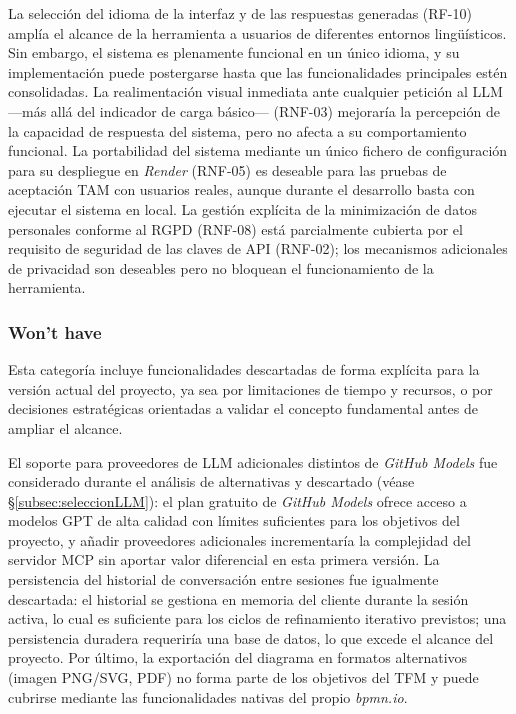 {La selección del idioma de la interfaz y de las respuestas generadas (RF-10) amplía el alcance de la herramienta a usuarios de diferentes entornos lingüísticos. Sin embargo, el sistema es plenamente funcional en un único idioma, y su implementación puede postergarse hasta que las funcionalidades principales estén consolidadas. La realimentación visual inmediata ante cualquier petición al LLM —más allá del indicador de carga básico— (RNF-03) mejoraría la percepción de la capacidad de respuesta del sistema, pero no afecta a su comportamiento funcional. La portabilidad del sistema mediante un único fichero de configuración para su despliegue en \textit{Render} (RNF-05) es deseable para las pruebas de aceptación TAM con usuarios reales, aunque durante el desarrollo basta con ejecutar el sistema en local. La gestión explícita de la minimización de datos personales conforme al RGPD (RNF-08) está parcialmente cubierta por el requisito de seguridad de las claves de API (RNF-02); los mecanismos adicionales de privacidad son deseables pero no bloquean el funcionamiento de la herramienta.

\subsubsection*{Won't have}

Esta categoría incluye funcionalidades descartadas de forma explícita para la versión actual del proyecto, ya sea por limitaciones de tiempo y recursos, o por decisiones estratégicas orientadas a validar el concepto fundamental antes de ampliar el alcance.

El soporte para proveedores de LLM adicionales distintos de \textit{GitHub Models} fue considerado durante el análisis de alternativas y descartado (véase \S\ref{subsec:seleccionLLM}): el plan gratuito de \textit{GitHub Models} ofrece acceso a modelos GPT de alta calidad con límites suficientes para los objetivos del proyecto, y añadir proveedores adicionales incrementaría la complejidad del servidor MCP sin aportar valor diferencial en esta primera versión. La persistencia del historial de conversación entre sesiones fue igualmente descartada: el historial se gestiona en memoria del cliente durante la sesión activa, lo cual es suficiente para los ciclos de refinamiento iterativo previstos; una persistencia duradera requeriría una base de datos, lo que excede el alcance del proyecto. Por último, la exportación del diagrama en formatos alternativos (imagen PNG/SVG, PDF) no forma parte de los objetivos del TFM y puede cubrirse mediante las funcionalidades nativas del propio \textit{bpmn.io}.

}
